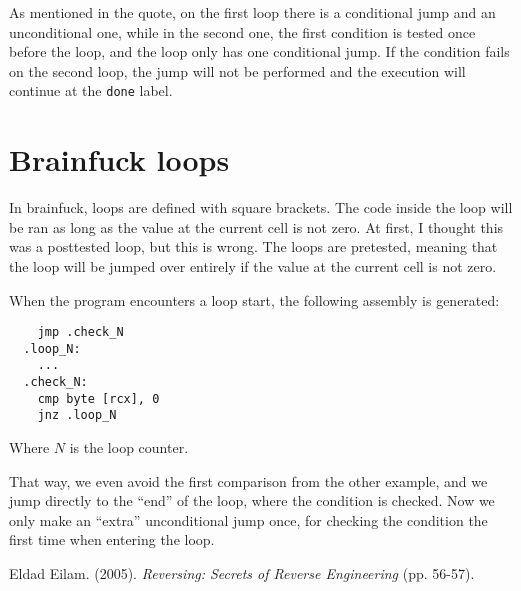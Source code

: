 \documentclass{amsart}
\begin{document}
As mentioned in the quote, on the first loop there is a conditional jump and an
unconditional one, while in the second one, the first condition is tested once
before the loop, and the loop only has one conditional jump. If the condition
fails on the second loop, the jump will not be performed and the execution will
continue at the \texttt{done} label.

\section{Brainfuck loops}

In brainfuck, loops are defined with square brackets. The code inside the loop
will be ran as long as the value at the current cell is not zero. At first, I
thought this was a posttested loop, but this is wrong. The loops are pretested,
meaning that the loop will be jumped over entirely if the value at the current
cell is not zero.

When the program encounters a loop start, the following assembly is generated:

\begin{lstlisting}
    jmp .check_N
  .loop_N:
    ...
  .check_N:
    cmp byte [rcx], 0
    jnz .loop_N
\end{lstlisting}

Where $N$ is the loop counter.

That way, we even avoid the first comparison from the other example, and we jump
directly to the ``end'' of the loop, where the condition is checked. Now we only
make an ``extra'' unconditional jump once, for checking the condition the first
time when entering the loop.


\bigskip

\begin{thebibliography}{9}
  Eldad Eilam. (2005). \textit{Reversing: Secrets of Reverse Engineering} (pp. 56-57).
\end{thebibliography}
\end{document}
